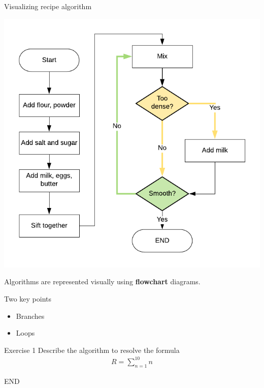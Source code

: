 \documentclass{beamer}
\newcommand{\bfemph}[1]{\textbf{#1}}
\renewcommand{\emph}[1]{\bfemph{#1}}
\begin{document}
\begin{frame}
    Visualizing recipe algorithm

    \centerline{\includegraphics[scale=0.8]{figures/recipe_algo.png}}
    
\end{frame}

\begin{frame}
    Algorithms are represented visually using \emph{flowchart} diagrams.

    \bigskip

    Two key points

    \bigskip

    \begin{itemize}
        \item Branches
        \item Loops
    \end{itemize}
\end{frame}

\begin{frame}

    \begin{block}{Exercise 1}
        Describe the algorithm to resolve the formula
        \begin{align*}
            R = \sum_{n=1}^{10} n
        \end{align*}
    \end{block}    

\end{frame}

\begin{frame}
    \centering
    END
\end{frame}
\end{document}
